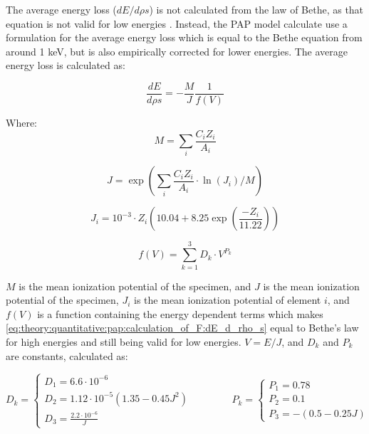 The average energy loss ($dE/d\rho s$) is not calculated from the law of Bethe, as that equation is not valid for low energies \cite{inokuti_on_bethe_1971,pap_1991}.
Instead, the PAP model calculate use a formulation for the average energy loss which is equal to the Bethe equation from around 1 keV, but is also empirically corrected for lower energies.
The average energy loss is calculated as:


\begin{equation}
    \label{eq:theory:quantitative:pap:calculation_of_F:dE_d_rho_s}
    \frac{dE}{d\rho s} = - \frac{M}{J} \frac{1}{f(V)}
\end{equation}

Where:
\begin{equation}
    \label{eq:theory:quantitative:pap:calculation_of_F:dE_d_rho_s:M}
    M = \sum \limits_{i} \frac{C_i Z_i}{A_i}
\end{equation}

\begin{equation}
    \label{eq:theory:quantitative:pap:calculation_of_F:dE_d_rho_s:J}
    J = \exp(\sum \limits_{i} \frac{C_i Z_i}{A_i} \cdot \ln(J_i)/M)
\end{equation}

\begin{equation}
    \label{eq:theory:quantitative:pap:calculation_of_F:dE_d_rho_s:Ji}
    J_i = 10^{-3} \cdot Z_i (10.04 + 8.25 \exp(\frac{-Z_i}{11.22}))
\end{equation}

\begin{equation}
    \label{eq:theory:quantitative:pap:calculation_of_F:dE_d_rho_s:one_over_f}
    f(V) = \sum \limits_{k=1}^{3} D_k \cdot V^{P_k}
\end{equation}

$M$ is the mean ionization potential of the specimen, and $J$ is the mean ionization potential of the specimen, $J_i$ is the mean ionization potential of element $i$, and $f(V)$ is a function containing the energy dependent terms which makes \cref{eq:theory:quantitative:pap:calculation_of_F:dE_d_rho_s} equal to Bethe's law for high energies and still being valid for low energies. $V = E/J$, and $D_k$ and $P_k$ are constants, calculated as:


\begin{equation}
    \label{eq:theory:quantitative:pap:calculation_of_F:dE_d_rho_s:one_over_f:d_k}
    D_k = \begin{cases}
        D_1 = 6.6 \cdot 10^{-6}                                 \\
        D_2 = 1.12 \cdot 10^{-5}(1.35 - 0.45 J^2) \qquad \qquad \\
        D_3 = \frac{2.2 \cdot 10^{-6}}{J}
    \end{cases}
    P_k = \begin{cases}
        P_1 =  0.78 \\
        P_2 = 0.1   \\
        P_3 =  -(0.5-0.25J)
    \end{cases}
\end{equation}

